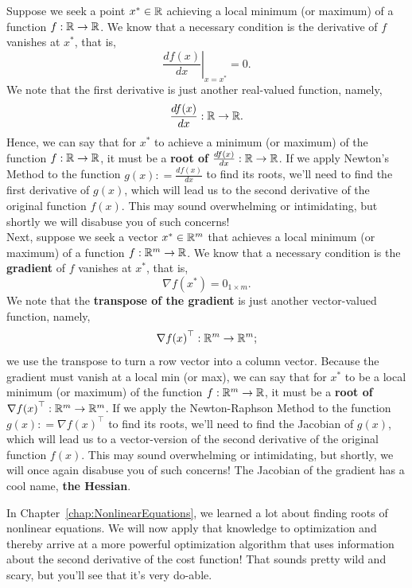 \begin{tcolorbox}[title =\textbf{\Large  Relation to Root Finding}]

Suppose we seek a point $x^\ast \in \mathbb R$ achieving a local minimum (or maximum) of a function $f: \mathbb R \to \mathbb R$. We know that a necessary condition is the derivative of $f$ vanishes at $x^\ast$, that is,
$$\left. \frac{df(x)}{dx} \right| _{x = x^\ast} = 0.$$
We note that the first derivative is just another real-valued function, namely, 
$$  \frac{df(x)}{dx}: \mathbb R \to \mathbb R.$$
Hence, we can say that for $x^\ast$ to achieve a minimum (or maximum) of the function $f:\mathbb R \to \mathbb R$, it must be a \textbf{root of} $ \frac{df(x)}{dx}: \mathbb R \to \mathbb R$. If we apply Newton's Method to the function $g(x): = \frac{df(x)}{dx}$ to find its roots, we'll need to find the first derivative of $g(x)$, which will lead us to the second derivative of the original function $f(x)$. This may sound overwhelming or intimidating, but shortly we will disabuse you of such concerns! \\

Next, suppose we seek a vector $x^\ast \in \mathbb R^m$ that achieves a local minimum (or maximum) of a function $f: \mathbb R^m \to \mathbb R$. We know that a necessary condition is the \textbf{gradient} of $f$ vanishes at $x^\ast$, that is,
$$ \nabla f(x^\ast) = 0_{1 \times m}.$$
We note that the \textbf{transpose of the gradient} is just another vector-valued function, namely, 
$$ {\nabla f(x)}^\top: \mathbb R^m \to \mathbb R^m;$$
we use the transpose to turn a row vector into a column vector. Because the gradient must vanish at a local min (or max), we can say that for $x^\ast$ to be a local minimum (or maximum) of the function $f:\mathbb R^m \to \mathbb R$, it must be a \textbf{root of} $ {\nabla f(x)}^\top: \mathbb R^m \to \mathbb R^m$. If we apply the Newton-Raphson Method to the function $g(x): = {\nabla f(x)}^\top$ to find its roots, we'll need to find the Jacobian of $g(x)$, which will lead us to a vector-version of the second derivative of the original function $f(x)$. This may sound overwhelming or intimidating, but shortly, we will once again disabuse you of such concerns! The Jacobian of the gradient has a cool name, \textbf{the Hessian}.
    
\end{tcolorbox}


In Chapter~\ref{chap:NonlinearEquations}, we learned a lot about finding roots of nonlinear equations. We will now apply that knowledge to optimization and thereby arrive at a more powerful optimization algorithm that uses information about the second derivative of the cost function! That sounds pretty wild and scary, but you'll see that it's very do-able. 

